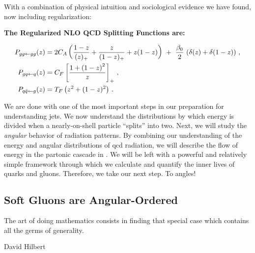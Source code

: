 With a combination of physical intuition and sociological evidence we have found, now including regularization:
\begin{answer}
    \begin{center}
        {\normalfont\Large\bfseries\sffamily The Regularized NLO QCD Splitting Functions are:}
    \end{center}

    \begin{subequations}
    \begin{align}
        \label{eq:p_gtogg}
        P_{gg \leftarrow gg}(z)
        &=
        2C_A \le(
            \frac{1-z}{(z)_+}
            +
            \frac{z}{(1-z)_+}
            +
            z(1-z)
        \ri)
        \,\,
        +
        \,\,
        \frac{\beta_0}{2}
        \,
        \le(\delta(z) + \delta(1-z)\ri)
        \,,
        \\
        \label{eq:p_qtogq}
        P_{gq \leftarrow q}(z)
        &=
        C_F \le[\frac{1+\le(1-z\ri)^2}{z}\ri]_+
        \,,
        \\
        \label{eq:p_gtoqq}
        P_{q\bar{q} \leftarrow g}(z)
        &=
        T_F \left(z^2 + (1-z)^2\right)
        \,.
    \end{align}
    \end{subequations}
\end{answer}


We are done with one of the most important steps in our preparation for understanding jets.
%
We now understand the distributions by which energy is divided when a nearly-on-shell particle ``splits'' into two.
%
Next, we will study the \textit{angular} behavior of radiation patterns.
%
By combining our understanding of the energy and angular distributions of \gls{qcd} radiation, we will describe the flow of energy in the partonic cascade in .
%
We will be left with a powerful and relatively simple framework through which we calculate and quantify the inner lives of quarks and gluons.
%
Therefore, we take our next step.
%
To angles!


\subsection{Soft Gluons are Angular-Ordered}
\label{sec:soft-gluons}

\epigraph{The art of doing mathematics consists in finding that special case which contains all the germs of generality.}{David Hilbert}

